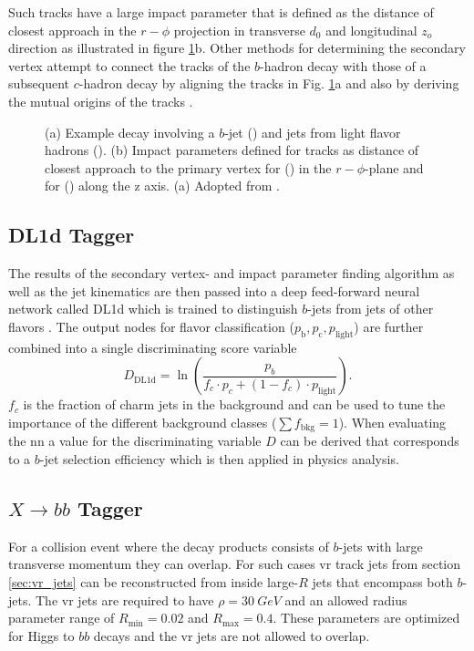 Such tracks have a large impact parameter that is defined as the distance of closest approach in the $r-\phi$ projection in transverse $d_0$ and longitudinal $z_o$ direction \citep{aad2008atlas} as illustrated in figure \ref{fig:secondary_vertex}b. Other methods for determining the secondary vertex attempt to connect the tracks of the $b$-hadron decay with those of a subsequent $c$-hadron decay by aligning the tracks in Fig. \ref{fig:secondary_vertex}a and also by deriving the mutual origins of the tracks \citep{ATL-PHYS-PUB-2017-013}.
\begin{figure}[]
  \centering
  \caption{(a) Example decay involving a $b$-jet () and jets from light flavor hadrons (). (b) Impact parameters defined for tracks as distance of closest approach to the primary vertex for (\mbox{\color[HTML]{009245}{$d_0$}}) in the $r-\phi$-plane and for (\mbox{\color[HTML]{EC1C25}{$z_0$}}) along the z axis. (a) Adopted from \cite{Guth:2765038}.}
  \label{fig:secondary_vertex}
\end{figure}

\subsection{DL1d Tagger}
The results of the secondary vertex- and impact parameter finding algorithm as well as the jet kinematics are then passed into a deep feed-forward neural network called DL1d which is trained to distinguish $b$-jets from jets of other flavors \citep{atlas2022atlas}. The output nodes for flavor classification ($p_\mathrm{b}, p_\mathrm{c}, p_\mathrm{light}$) are further combined into a single discriminating score variable
\begin{equation}
  D_\mathrm{DL1d}=\ln\left(\frac{p_b}{f_c \cdot p_c + (1-f_c)\cdot p_\mathrm{light} }\right).
\end{equation}
$f_c$ is the fraction of charm jets in the background and can be used to tune the importance of the different background classes ($\sum f_\mathrm{bkg} =1$). When evaluating the \ac{nn} a value for the discriminating variable $D$ can be derived that corresponds to a $b$-jet selection efficiency which is then applied in physics analysis.

\subsection{$X\rightarrow bb$ Tagger}\label{sec:xbb}
For a collision event where the decay products consists of $b$-jets with large transverse momentum they can overlap. For such cases \ac{vr} track jets from section \ref{sec:vr_jets} can be reconstructed from inside large-$R$ jets that encompass both $b$-jets. The \ac{vr} jets are required to have $\rho=\qty[]{30}{GeV}$ and an allowed radius parameter range of $R_\text{min}=0.02$ and $R_\text{max}=0.4$. These parameters are optimized for Higgs to $bb$ decays \citep{ATL-PHYS-PUB-2017-010} and the \ac{vr} jets are not allowed to overlap.

